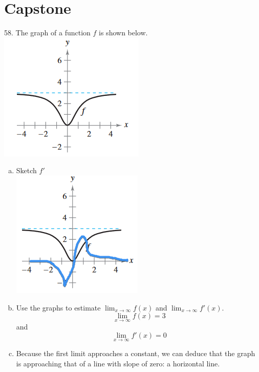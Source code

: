 \documentclass[11pt]{article}
\begin{document}
\section{Capstone}
58. The graph of a function $f$ is shown below.\\
\includegraphics{58a.png}
\begin{enumerate}[(a)]
    \item Sketch $f'$\\ \includegraphics{58b.png}
    \item Use the graphs to estimate $\lim_{x\to\infty}f(x)$ and $\lim_{x\to\infty}f'(x)$.\\
    \[\lim_{x\to\infty}f(x)=3\] and \[\lim_{x\to\infty}f'(x)=0\]
    \item Because the first limit approaches a constant, we can deduce that the graph is approaching that of a line with slope of zero: a horizontal line.
\end{enumerate}
\end{document}
